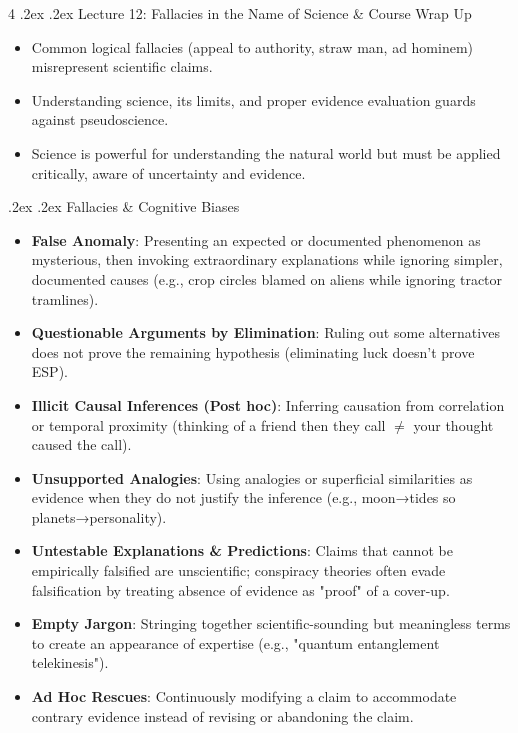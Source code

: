 \documentclass[10pt,landscape,a4paper]{article}
\makeatletter
\renewcommand{\section}{\@startsection{section}{1}{0mm}%
  {.2ex}%
  {.2ex}%
{\color{myblue}\sffamily\small\bfseries}}
\renewcommand{\subsection}{\@startsection{subsection}{1}{0mm}%
  {.2ex}%
  {.2ex}%
{\sffamily\bfseries}}
\makeatother
\begin{document}
\begin{multicols*}{4}
  \section{Lecture 12: Fallacies in the Name of Science \& Course Wrap Up}
  \begin{itemize}
    \item Common logical fallacies (appeal to authority, straw man, ad hominem) misrepresent scientific claims.
    \item Understanding science, its limits, and proper evidence evaluation guards against pseudoscience.
    \item Science is powerful for understanding the natural world but must be applied critically, aware of uncertainty and evidence.
  \end{itemize}

  \subsection{Fallacies \& Cognitive Biases}
  \begin{itemize}
    \item \textbf{False Anomaly}: Presenting an expected or documented phenomenon as mysterious, then invoking extraordinary explanations while ignoring simpler, documented causes (e.g., crop circles blamed on aliens while ignoring tractor tramlines).
    \item \textbf{Questionable Arguments by Elimination}: Ruling out some alternatives does not prove the remaining hypothesis (eliminating luck doesn't prove ESP).
    \item \textbf{Illicit Causal Inferences (Post hoc)}: Inferring causation from correlation or temporal proximity (thinking of a friend then they call $\neq$ your thought caused the call).
    \item \textbf{Unsupported Analogies}: Using analogies or superficial similarities as evidence when they do not justify the inference (e.g., moon→tides so planets→personality).
    \item \textbf{Untestable Explanations \& Predictions}: Claims that cannot be empirically falsified are unscientific; conspiracy theories often evade falsification by treating absence of evidence as "proof" of a cover-up.
    \item \textbf{Empty Jargon}: Stringing together scientific-sounding but meaningless terms to create an appearance of expertise (e.g., "quantum entanglement telekinesis").
    \item \textbf{Ad Hoc Rescues}: Continuously modifying a claim to accommodate contrary evidence instead of revising or abandoning the claim.

\end{itemize}
\end{multicols*}
\end{document}
